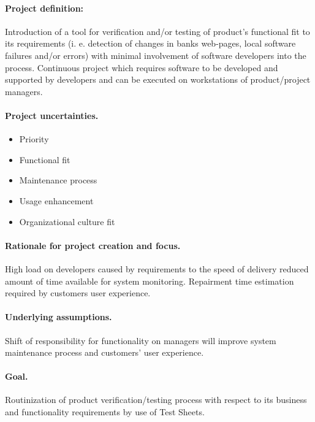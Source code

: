 \paragraph{Project definition:} Introduction of a tool for verification and/or testing of product’s functional fit to its requirements (i. e. detection of changes in banks web-pages, local software failures and/or errors) with minimal involvement of software developers into the process. Continuous project which requires software to be developed and supported by developers and can be executed on workstations of product/project managers.

\paragraph{Project uncertainties.}
\begin{itemize}
	\item Priority
	\item Functional fit
	\item Maintenance process
	\item Usage enhancement
	\item Organizational culture fit
\end{itemize}

\paragraph{Rationale for project creation and focus.} High load on developers caused by requirements to the speed of delivery reduced amount of time available for system monitoring. Repairment time estimation required by customers user experience. 


\paragraph{Underlying assumptions.} Shift of responsibility for functionality  on managers will improve system maintenance process and customers' user experience. 

\paragraph{Goal.} Routinization of product verification/testing process with respect to its business and functionality requirements by use of Test Sheets.
